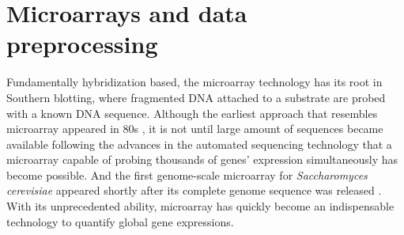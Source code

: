 \section{Microarrays and data preprocessing}

Fundamentally hybridization based, the microarray technology has its root in
Southern blotting, where fragmented DNA attached to a substrate are probed with
a known DNA sequence.
%
Although the earliest approach that resembles microarray appeared in
80s \cite{Augenlicht1982}, it is not until large amount of sequences
became available following the advances in the automated sequencing
technology that a microarray capable of probing thousands of genes'
expression simultaneously has become possible.
%
And the first genome-scale microarray for \textit{Saccharomyces
  cerevisiae} \cite{Davis1997} appeared shortly after its complete
genome sequence was released \cite{Goffeau1996}.
%
With its unprecedented ability, microarray has quickly become an
indispensable technology to quantify global gene expressions.


